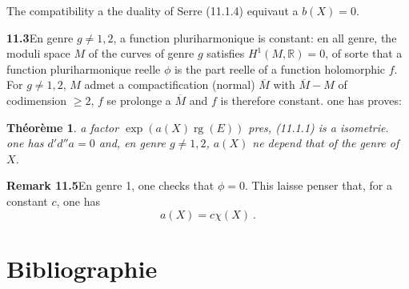 \documentclass[12pt,a4paper]{article}
\theoremstyle{plain}
\newtheorem{theorem}{Th\'eor\`eme}[section]
\theoremstyle{definition}
\theoremstyle{remark}
\newcommand{\bbR}{\mathbb{R}}
\DeclareMathOperator{\rg}{rg}
\begin{document}
The compatibility a the duality of Serre (11.1.4) equivaut a $b(X) = 0$.

\medskip
\noindent\textbf{11.3}\quad En genre $g \neq 1, 2$, a function pluriharmonique is constant: en all genre, the moduli space $M$ of the curves of genre $g$ satisfies $H^1(M, \bbR) = 0$, of sorte that a function pluriharmonique reelle $\phi$ is the part reelle of a function holomorphic $f$. For $g \neq 1, 2$, $M$ admet a compactification (normal) $\overline{M}$ with $\overline{M} - M$ of codimension $\geq 2$, $f$ se prolonge a $\overline{M}$ and $f$ is therefore constant. one has proves:

\begin{theorem}
a factor $\exp(a(X) \rg(E))$ pres, (11.1.1) is a isometrie. one has $d'd''a = 0$ and, en genre $g \neq 1, 2$, $a(X)$ ne depend that of the genre of $X$.
\end{theorem}

\medskip
\noindent\textbf{Remark 11.5}\quad En genre 1, one checks that $\phi = 0$. This laisse penser that, for a constant $c$, one has
\[
a(X) = c \chi(X) \ .
\]


\section*{Bibliographie}
\end{document}
